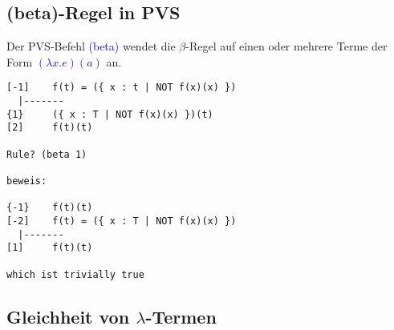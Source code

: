 \documentclass{scrartcl}
\begin{document}
\subsection{(beta)-Regel in PVS}

Der PVS-Befehl \textcolor{blue}{(beta)} wendet die $ \beta $-Regel auf einen oder mehrere Terme der Form \textcolor{blue}{$ (\lambda x.e)(a) $} an.

\begin{lstlisting}
[-1]	f(t) = ({ x : t | NOT f(x)(x) })
  |-------
{1}		({ x : T | NOT f(x)(x) })(t)
[2]		f(t)(t)

Rule? (beta 1)

beweis:

{-1}	f(t)(t)
[-2]	f(t) = ({ x : T | NOT f(x)(x) })
  |-------
[1]		f(t)(t)

which ist trivially true
\end{lstlisting}

\subsection{Gleichheit von $ \lambda $-Termen}
\end{document}
